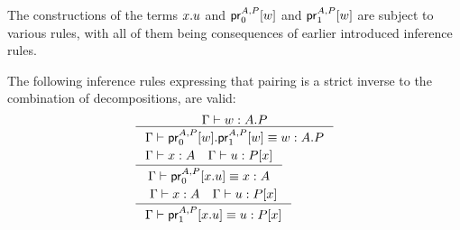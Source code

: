 The constructions of the terms $\ctxext{x}{u}$ and $\cprojfst{A}{P}{w}$ and
$\cprojsnd{A}{P}{w}$ are subject to various rules, with all of them being
consequences of earlier introduced inference rules.

\begin{lem} The following inference rules expressing that pairing is a strict
inverse to the combination of decompositions, are valid:
\begin{align*}
& \inference
  {\jterm{\Gamma}{\ctxext{A}{P}}{w}}
  {\jtermeq{\Gamma}{\ctxext{A}{P}}{\ctxext{\cprojfst{A}{P}{w}}{\cprojsnd{A}{P}{w}}}{w}}\\
& \inference
  {\jterm{\Gamma}{A}{x}
   \jterm{\Gamma}{\subst{x}{P}}{u}}
  {\jtermeq{\Gamma}{A}{\cprojfst{A}{P}{\ctxext{x}{u}}}{x}}\\
& \inference
  {\jterm{\Gamma}{A}{x}
   \jterm{\Gamma}{\subst{x}{P}}{u}}
  {\jtermeq{\Gamma}{\subst{x}{P}}{\cprojsnd{A}{P}{\ctxext{x}{u}}}{u}}
\end{align*}
\end{lem}

